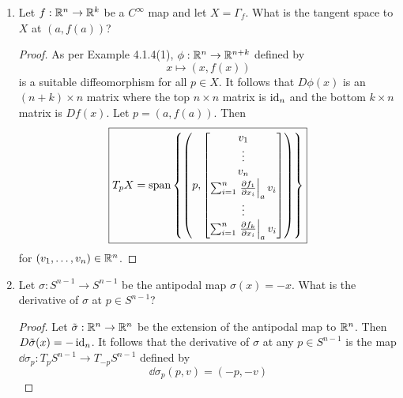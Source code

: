 \documentclass[../psets.tex]{subfiles}
\begin{document}
\begin{enumerate}[label={\textbf{4.2.\roman*.}}]
\begin{proof}
\begin{align*}
            v_i &= \frac{-q_1v_1-\cdots-q_{i-1}v_{i-1}-q_{i+1}v_{i+1}+\cdots+q_nv_n}{\sqrt{1-\left( q_1^2+\cdots+q_{n-1}^2 \right)}}
        \end{align*}
        so with some reindexing, $v$ fits the form of the vector in the span defining $T_pS^{n-1}$, as desired.
    \end{proof}
    \item Let $f:\mathbb{R}^n\to\mathbb{R}^k$ be a $C^\infty$ map and let $X=\Gamma_f$. What is the tangent space to $X$ at $(a,f(a))$?
    \begin{proof}
        As per Example 4.1.4(1), $\phi:\mathbb{R}^n\to\mathbb{R}^{n+k}$ defined by
        \begin{equation*}
            x \mapsto (x,f(x))
        \end{equation*}
        is a suitable diffeomorphism for all $p\in X$. It follows that $D\phi(x)$ is an $(n+k)\times n$ matrix where the top $n\times n$ matrix is $\operatorname{id}_n$ and the bottom $k\times n$ matrix is $Df(x)$. Let $p=(a,f(a))$. Then
        \begin{equation*}
            \boxed{T_pX = \spn\left\{ \left( p,
                \begin{bmatrix}
                    v_1\\
                    \vdots\\
                    v_n\\
                    \sum_{i=1}^n\eval{\pdv{f_1}{x_i}}_av_i\\
                    \vdots\\
                    \sum_{i=1}^n\eval{\pdv{f_k}{x_i}}_av_i\\
                \end{bmatrix}
            \right) \right\}}
        \end{equation*}
        for $(v_1,\dots,v_n)\in\mathbb{R}^n$.
    \end{proof}
    \item Let $\sigma:S^{n-1}\to S^{n-1}$ be the antipodal map $\sigma(x)=-x$. What is the derivative of $\sigma$ at $p\in S^{n-1}$?
    \begin{proof}
        Let $\tilde{\sigma}:\mathbb{R}^n\to\mathbb{R}^n$ be the extension of the antipodal map to $\mathbb{R}^n$. Then $D\tilde{\sigma}(x)=-\operatorname{id}_n$. It follows that the derivative of $\sigma$ at any $p\in S^{n-1}$ is the map $\dd\sigma_p:T_pS^{n-1}\to T_{-p}S^{n-1}$ defined by
        \begin{equation*}
            \boxed{\dd\sigma_p(p,v) = (-p,-v)}
        \end{equation*}

\end{proof}
\end{enumerate}
\end{document}

